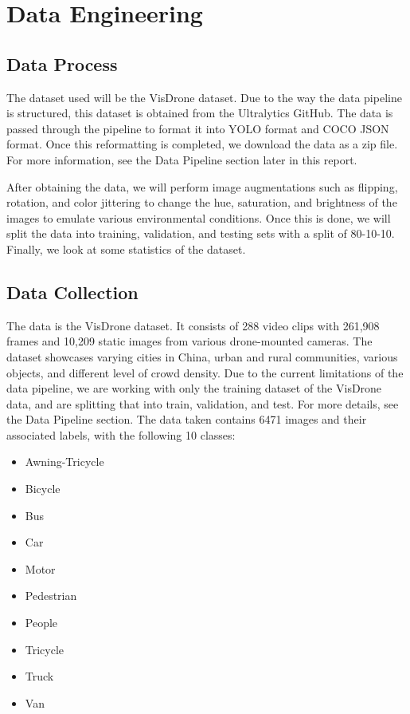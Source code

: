 \documentclass[stu,12pt,floatsintext]{apa7}
\begin{document}
\section{Data Engineering}
\subsection{Data Process}
The dataset used will be the VisDrone dataset. Due to the way the data pipeline is structured, this dataset is obtained from the Ultralytics GitHub. The data is passed through the pipeline to format it into YOLO format and COCO JSON format. Once this reformatting is completed, we download the data as a zip file. For more information, see the Data Pipeline section later in this report.

After obtaining the data, we will perform image augmentations such as flipping, rotation, and color jittering to change the hue, saturation, and brightness of the images to emulate various environmental conditions. Once this is done, we will split the data into training, validation, and testing sets with a split of 80-10-10. Finally, we look at some statistics of the dataset.

\subsection{Data Collection}
The data is the VisDrone dataset. It consists of 288 video clips with 261,908 frames and 10,209 static images from various drone-mounted cameras. The dataset showcases varying cities in China, urban and rural communities, various objects, and different level of crowd density. Due to the current limitations of the data pipeline, we are working with only the training dataset of the VisDrone data, and are splitting that into train, validation, and test. For more details, see the Data Pipeline section.
The data taken contains 6471 images and their associated labels, with the following 10 classes:
\begin{itemize}
	\item Awning-Tricycle
	\item Bicycle
	\item Bus
	\item Car
	\item Motor
	\item Pedestrian
	\item People
	\item Tricycle
	\item Truck
	\item Van
\end{itemize}
\end{document}
